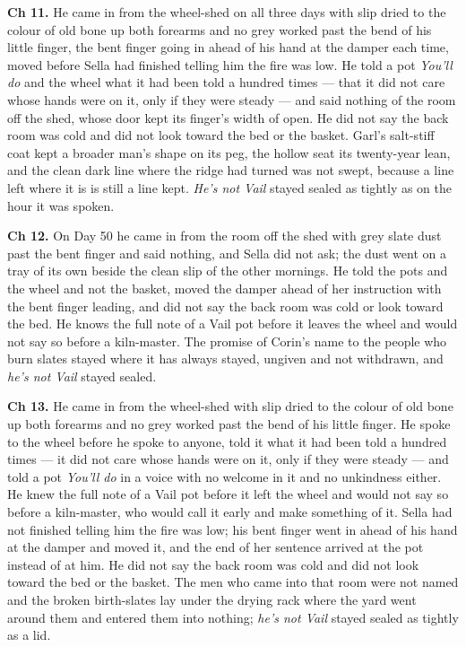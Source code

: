 \documentclass{design/chronicle}
\begin{document}
{\textbf{Ch 11.} He came in from the wheel-shed on all three days with slip dried to the colour of old bone up both forearms and no grey worked past the bend of his little finger, the bent finger going in ahead of his hand at the damper each time, moved before Sella had finished telling him the fire was low. He told a pot \emph{You’ll do} and the wheel what it had been told a hundred times --- that it did not care whose hands were on it, only if they were steady --- and said nothing of the room off the shed, whose door kept its finger’s width of open. He did not say the back room was cold and did not look toward the bed or the basket. Garl’s salt-stiff coat kept a broader man’s shape on its peg, the hollow seat its twenty-year lean, and the clean dark line where the ridge had turned was not swept, because a line left where it is is still a line kept. \emph{He’s not Vail} stayed sealed as tightly as on the hour it was spoken.

\textbf{Ch 12.} On Day 50 he came in from the room off the shed with grey slate dust past the bent finger and said nothing, and Sella did not ask; the dust went on a tray of its own beside the clean slip of the other mornings. He told the pots and the wheel and not the basket, moved the damper ahead of her instruction with the bent finger leading, and did not say the back room was cold or look toward the bed. He knows the full note of a Vail pot before it leaves the wheel and would not say so before a kiln-master. The promise of Corin’s name to the people who burn slates stayed where it has always stayed, ungiven and not withdrawn, and \emph{he’s not Vail} stayed sealed.

\textbf{Ch 13.} He came in from the wheel-shed with slip dried to the colour of old bone up both forearms and no grey worked past the bend of his little finger. He spoke to the wheel before he spoke to anyone, told it what it had been told a hundred times --- it did not care whose hands were on it, only if they were steady --- and told a pot \emph{You’ll do} in a voice with no welcome in it and no unkindness either. He knew the full note of a Vail pot before it left the wheel and would not say so before a kiln-master, who would call it early and make something of it. Sella had not finished telling him the fire was low; his bent finger went in ahead of his hand at the damper and moved it, and the end of her sentence arrived at the pot instead of at him. He did not say the back room was cold and did not look toward the bed or the basket. The men who came into that room were not named and the broken birth-slates lay under the drying rack where the yard went around them and entered them into nothing; \emph{he’s not Vail} stayed sealed as tightly as a lid.

}
\end{document}
